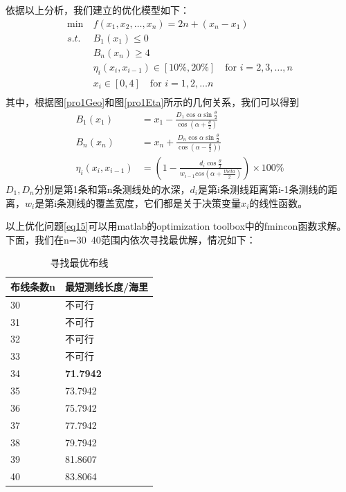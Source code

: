 \documentclass{article}
\begin{document}
	\par 依据以上分析，我们建立的优化模型如下：
	\begin{equation}
		\begin{split}
			\min & \  f(x_1,x_2,\dots,x_n) = 2n+(x_n-x_1) \\
			s.t. & \  B_1(x_1)\le0\\
			& \  B_n(x_n)\ge4\\
			& \ \eta_i(x_i,x_{i-1}) \in [10\%,20\%] \quad \text{for}\,\, i = 2,3,\dots, n\\
			& \  x_i\in [0,4] \quad \text{for}\,\, i=1,2,\dots n\\
		\end{split}
		\label{eq15}
	\end{equation}
	其中，根据图\ref{pro1Geo}和图\ref{pro1Eta}所示的几何关系，我们可以得到
	\begin{align*}
		B_1(x_1) &= x_1 - \frac{D_1\cos\alpha\sin\frac{\theta}{2}}{\cos(\alpha+\frac{\theta}{2})}\\
		B_n(x_n) &= x_n + \frac{D_n\cos\alpha\sin\frac{\theta}{2}}{\cos(\alpha-\frac{\theta}{2}))}\\
		\eta_i(x_i,x_{i-1}) &= (1-\frac{d_i\cos\frac{\theta}{2}}{w_{i-1}cos(\alpha+\frac{theta}{2})}) \times 100 \%
	\end{align*}
	$D_1,D_n$分别是第1条和第n条测线处的水深，$d_i$是第i条测线距离第i-1条测线的距离，$w_i$是第i条测线的覆盖宽度，它们都是关于决策变量$x_i$的线性函数。
	\par 以上优化问题\eqref{eq15}可以用matlab的optimization toolbox中的fmincon函数求解。
	下面，我们在n=30~40范围内依次寻找最优解，情况如下：
	\begin{table}[H]
		\centering
		\caption{寻找最优布线}
		\begin{tabular}{ll}
			\hline
			布线条数n & 最短测线长度/海里 \\ \hline
			30    & 不可行       \\
			31    & 不可行       \\
			32    & 不可行       \\
			33    & 不可行       \\
			34    & \textbf{71.7942}   \\
			35    & 73.7942   \\
			36    & 75.7942   \\
			37    & 77.7942   \\
			38    & 79.7942   \\
			39    & 81.8607   \\
			40    & 83.8064   \\ \hline
		\end{tabular}
	\end{table}
\end{document}
